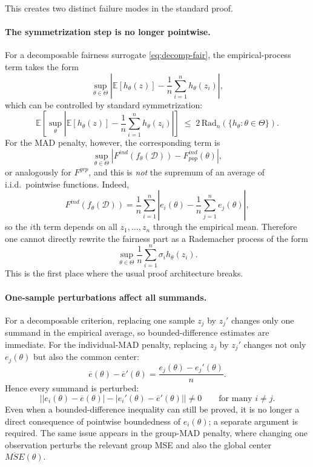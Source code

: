 \documentclass[ijoc,sglanonrev]{informs4}
\begin{document}
This creates two distinct failure modes in the standard proof.

\paragraph{The symmetrization step is no longer pointwise.}
For a decomposable fairness surrogate \eqref{eq:decomp-fair}, the empirical-process term takes the form
\[
\sup_{\theta\in\Theta}
\left|
\mathbb E[h_\theta(z)] - \frac{1}{n}\sum_{i=1}^n h_\theta(z_i)
\right|,
\]
which can be controlled by standard symmetrization:
\[
\mathbb E\left[\sup_{\theta}
\left|
\mathbb E[h_\theta(z)] - \frac{1}{n}\sum_{i=1}^n h_\theta(z_i)
\right|\right]
\;\le\;
2\,\text{Rad}_n(\{h_\theta:\theta\in\Theta\}).
\]
For the MAD penalty, however, the corresponding term is
\[
\sup_{\theta\in\Theta}
\left|
F^{ind}(f_\theta(\mathcal D))
-
F^{ind}_{pop}(\theta)
\right|,
\]
or analogously for $F^{grp}$, and this is \emph{not} the supremum of an average of i.i.d.\ pointwise
functions.
Indeed,
\[
F^{ind}(f_\theta(\mathcal D))
=
\frac{1}{n}\sum_{i=1}^n
\left|
e_i(\theta)-\frac{1}{n}\sum_{j=1}^n e_j(\theta)
\right|,
\]
so the $i$th term depends on all $z_1,\ldots,z_n$ through the empirical mean.
Therefore one cannot directly rewrite the fairness part as a Rademacher process of the form
\[
\sup_{\theta\in\Theta}
\frac{1}{n}\sum_{i=1}^n \sigma_i h_\theta(z_i).
\]
This is the first place where the usual proof architecture breaks.

\paragraph{One-sample perturbations affect all summands.}
For a decomposable criterion, replacing one sample $z_j$ by $z_j'$ changes only one summand in
the empirical average, so bounded-difference estimates are immediate.
For the individual-MAD penalty, replacing $z_j$ by $z_j'$ changes not only $e_j(\theta)$ but also
the common center:
\[
\overline e(\theta)-\overline e'(\theta)=\frac{e_j(\theta)-e_j'(\theta)}{n}.
\]
Hence every summand is perturbed:
\[
\left|
|e_i(\theta)-\overline e(\theta)|
-
|e_i'(\theta)-\overline e'(\theta)|
\right|
\neq 0
\qquad
\text{for many } i\neq j.
\]
Even when a bounded-difference inequality can still be proved, it is no longer a direct consequence
of pointwise boundedness of $e_i(\theta)$; a separate argument is required.
The same issue appears in the group-MAD penalty, where changing one observation perturbs the
relevant group MSE and also the global center $\overline{MSE}(\theta)$.
\end{document}
